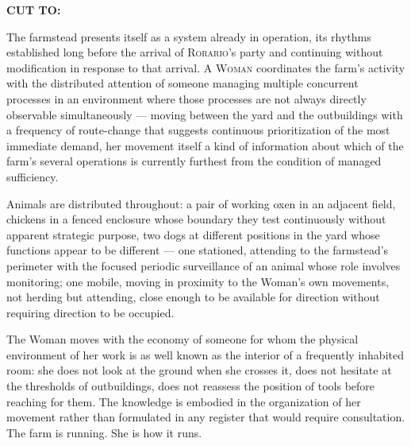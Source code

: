 \documentclass[12pt, oneside]{article}
\newcommand{\sceneheading}[1]{%
  \vspace{1.8em}%
  \noindent{\bfseries\large\MakeUppercase{#1}}%
  \vspace{0.6em}%
  \par\noindent{\color{rulecolor}\rule{\linewidth}{0.3pt}}%
  \vspace{0.5em}\par%
}
\newenvironment{action}{%
  \vspace{0.6em}%
  \noindent\ignorespaces%
}{%
  \par\vspace{0.6em}%
}
\newcommand{\scenenumber}[1]{%
  \vspace{1em}%
  \noindent{\small\bfseries\scshape Scene #1}%
  \vspace{0.3em}\par%
}
\newcommand{\transition}[1]{%
  \vspace{0.8em}%
  \begin{flushright}%
    \bfseries #1%
  \end{flushright}%
  \vspace{0.5em}%
}
\begin{document}
\transition{CUT TO:}

\scenenumber{9a — The Farm}

\sceneheading{EXT. Farmstead — Day}

\begin{action}
The farmstead presents itself as a system already in operation, its rhythms established long before the arrival of \textsc{Rorario}'s party and continuing without modification in response to that arrival. A \textsc{Woman} coordinates the farm's activity with the distributed attention of someone managing multiple concurrent processes in an environment where those processes are not always directly observable simultaneously --- moving between the yard and the outbuildings with a frequency of route-change that suggests continuous prioritization of the most immediate demand, her movement itself a kind of information about which of the farm's several operations is currently furthest from the condition of managed sufficiency.

Animals are distributed throughout: a pair of working oxen in an adjacent field, chickens in a fenced enclosure whose boundary they test continuously without apparent strategic purpose, two dogs at different positions in the yard whose functions appear to be different --- one stationed, attending to the farmstead's perimeter with the focused periodic surveillance of an animal whose role involves monitoring; one mobile, moving in proximity to the Woman's own movements, not herding but attending, close enough to be available for direction without requiring direction to be occupied.

The Woman moves with the economy of someone for whom the physical environment of her work is as well known as the interior of a frequently inhabited room: she does not look at the ground when she crosses it, does not hesitate at the thresholds of outbuildings, does not reassess the position of tools before reaching for them. The knowledge is embodied in the organization of her movement rather than formulated in any register that would require consultation. The farm is running. She is how it runs.
\end{action}
\end{document}
